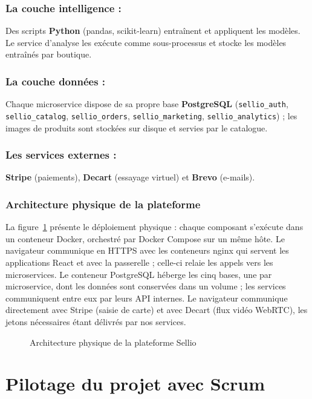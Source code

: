 \subsubsection*{La couche intelligence :}
Des scripts \textbf{Python} (pandas, scikit-learn) entraînent et appliquent les modèles. Le service d'analyse les exécute comme sous-processus et stocke les modèles entraînés par boutique.

\subsubsection*{La couche données :}
Chaque microservice dispose de sa propre base \textbf{PostgreSQL} (\texttt{sellio\_auth}, \texttt{sellio\_catalog}, \texttt{sellio\_orders}, \texttt{sellio\_marketing}, \texttt{sellio\_analytics}) ; les images de produits sont stockées sur disque et servies par le catalogue.

\subsubsection*{Les services externes :}
\textbf{Stripe} (paiements), \textbf{Decart} (essayage virtuel) et \textbf{Brevo} (e-mails).

\subsubsection{Architecture physique de la plateforme}
La figure~\ref{fig:archi_physique} présente le déploiement physique : chaque composant s'exécute dans un conteneur Docker, orchestré par Docker Compose sur un même hôte. Le navigateur communique en HTTPS avec les conteneurs nginx qui servent les applications React et avec la passerelle ; celle-ci relaie les appels vers les microservices. Le conteneur PostgreSQL héberge les cinq bases, une par microservice, dont les données sont conservées dans un volume ; les services communiquent entre eux par leurs API internes. Le navigateur communique directement avec Stripe (saisie de carte) et avec Decart (flux vidéo WebRTC), les jetons nécessaires étant délivrés par nos services.
\begin{figure}[H]
    \centering
    \caption{Architecture physique de la plateforme Sellio}
    \label{fig:archi_physique}
\end{figure}

\section{Pilotage du projet avec Scrum}
